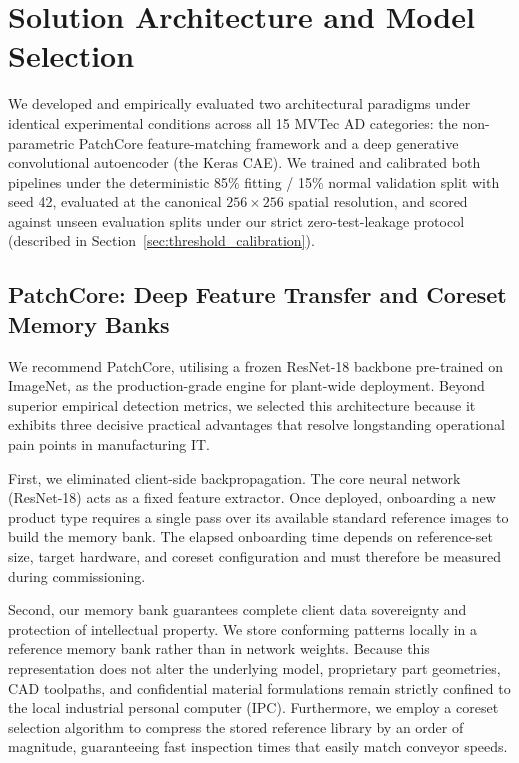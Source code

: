 \section{Solution Architecture and Model Selection}
\label{sec:model_selection}

We developed and empirically evaluated two architectural paradigms under identical experimental conditions across all 15 MVTec AD categories: the non-parametric PatchCore feature-matching framework and a deep generative convolutional autoencoder (the Keras CAE). We trained and calibrated both pipelines under the deterministic 85\% fitting / 15\% normal validation split with seed 42, evaluated at the canonical $256 \times 256$ spatial resolution, and scored against unseen evaluation splits under our strict zero-test-leakage protocol (described in Section~\ref{sec:threshold_calibration}).

\subsection{PatchCore: Deep Feature Transfer and Coreset Memory Banks}

We recommend PatchCore, utilising a frozen ResNet-18 backbone pre-trained on ImageNet, as the production-grade engine for plant-wide deployment. Beyond superior empirical detection metrics, we selected this architecture because it exhibits three decisive practical advantages that resolve longstanding operational pain points in manufacturing IT.

First, we eliminated client-side backpropagation. The core neural network (ResNet-18) acts as a fixed feature extractor. Once deployed, onboarding a new product type requires a single pass over its available standard reference images to build the memory bank. The elapsed onboarding time depends on reference-set size, target hardware, and coreset configuration and must therefore be measured during commissioning.

Second, our memory bank guarantees complete client data sovereignty and protection of intellectual property. We store conforming patterns locally in a reference memory bank rather than in network weights. Because this representation does not alter the underlying model, proprietary part geometries, CAD toolpaths, and confidential material formulations remain strictly confined to the local industrial personal computer (IPC). Furthermore, we employ a coreset selection algorithm to compress the stored reference library by an order of magnitude, guaranteeing fast inspection times that easily match conveyor speeds.

